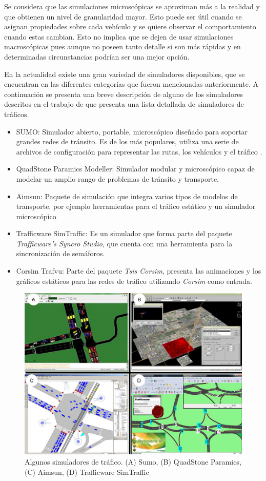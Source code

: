 Se considera que las simulaciones microscópicas se aproximan más a la realidad y que obtienen un nivel de granularidad mayor. Esto puede ser útil cuando se asignan propiedades sobre cada vehículo y se quiere observar el comportamiento cuando estas cambian. Esto no implica que se dejen de usar simulaciones macroscópicas pues aunque no poseen tanto detalle si son más rápidas y en determinadas circunstancias podrían ser una mejor opción.

En la actualidad existe una gran variedad de simuladores disponibles, que se encuentran en las diferentes categorías que fueron mencionadas anteriormente. A continuación se presenta una breve descripción de alguno de los simuladores descritos en el trabajo de \citet{review_trafico} que presenta una lista detallada de simuladores de tráficos.
\begin{itemize}
	\item SUMO: Simulador abierto, portable, microscópico diseñado para soportar grandes redes de tránsito. Es de los más populares, utiliza una serie de archivos de configuración para representar las rutas, los vehículos y el tráfico \citep{SUMO}.
	\item QuadStone Paramics Modeller: Simulador modular y microscópico capaz de modelar un amplio rango de problemas de tránsito y transporte.
	\item Aimsun: Paquete de simulación que integra varios tipos de modelos de transporte, por ejemplo herramientas para el tráfico estático y un simulador microscópico
	\item Trafficware SimTraffic: Es un simulador que forma parte del paquete \emph{Trafficware's Syncro Studio}, que cuenta con una herramienta para la sincronización de semáforos.
	\item Corsim Trafvu: Parte del paquete \emph{Tsis Corsim}, presenta las animaciones y los gráficos estáticos para las redes de tráfico utilizando \emph{Corsim} como entrada.
\end{itemize}


\begin{figure}[H]
	\centering
	\includegraphics[width=0.9\linewidth]{Figures/simuladores}
	\caption[]{Algunos simuladores de tráfico. (A) Sumo, (B) QuadStone Paramics, (C) Aimsun, (D) Trafficware SimTraffic}
	\label{fig:simuladores}
\end{figure}

